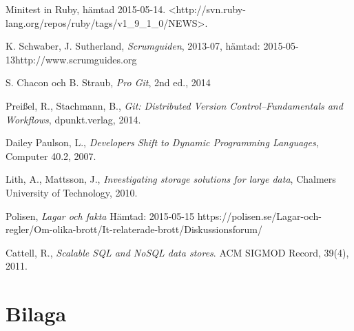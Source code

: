 \documentclass[a4paper,12pt,oneside,final]{extbook}
\begin{document}
\begin{thebibliography}{99}
  Minitest in Ruby, hämtad 2015-05-14.
  \newline<http://svn.ruby-lang.org/repos/ruby/tags/v1\_9\_1\_0/NEWS>.

  K. Schwaber, J. Sutherland, \emph{Scrumguiden}, 2013-07, hämtad: 2015-05-13\newline http://www.scrumguides.org

  S. Chacon och B. Straub, \emph{Pro Git}, 2nd ed., 2014

  Preißel, R., Stachmann, B., \emph{Git: Distributed Version Control--Fundamentals and Workflows}, dpunkt.verlag, 2014.

  Dailey Paulson, L., \emph{Developers Shift to Dynamic Programming Languages}, Computer 40.2, 2007.

  Lith, A., Mattsson, J., \emph{Investigating storage solutions for large data}, Chalmers University of Technology, 2010.

  Polisen, \emph{Lagar och fakta} Hämtad: 2015-05-15
  \newline https://polisen.se/Lagar-och-regler/Om-olika-brott/It-relaterade-brott/Diskussionsforum/

  Cattell, R., \emph{Scalable SQL and NoSQL data stores}. ACM SIGMOD Record, 39(4), 2011.

\bibitem{}
\bibitem{}
\bibitem{}
\bibitem{}
\bibitem{}
\bibitem{}

\end{thebibliography}


\appendix

\chapter{Bilaga}
\end{document}
